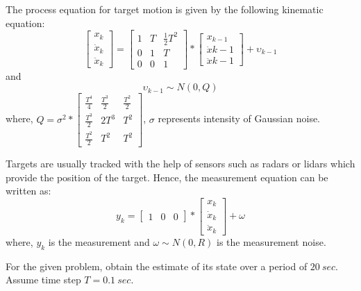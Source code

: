 \documentclass[a4paper,12pt]{extarticle}
\theoremstyle{mytheor}
\begin{document}
The process equation for target motion is given by the following kinematic equation:
\begin{equation}
\left[ \begin{array}{c} x_k \\ \dot{x}_k \\ \ddot{x}_k \end{array} \right] = 
\left[ \begin{array}{ccc} 1 & T & \frac1{2}T^2 \\ 0 & 1 & T \\ 0 & 0 & 1  \end{array} \right] * \left[ \begin{array}{c} x_{k-1} \\ \dot{x}{k-1} \\ \ddot{x}{k-1} \end{array} \right] + \upsilon_{k-1}
\end{equation}
and 
\begin{equation}
\upsilon_{k-1} \sim N(0, Q)
\end{equation}
where,
$ Q = \sigma^2 * \left[ \begin{array}{ccc} \frac{T^4}{4} & \frac{T^3}{2} & \frac{T^2}{2} \\ \frac{T^3}{2} & 2T^3 & T^2 \\ \frac{T^2}{2} & T^2 & T^2  \end{array} \right] $, $\sigma$ represents intensity of Gaussian noise.

Targets are usually tracked with the help of sensors such as radars or lidars which provide the position of the target. Hence, the measurement equation can be written as:
\begin{equation}
y_k = 
\left[ \begin{array}{ccc} 1 & 0 & 0 \end{array} \right] * \left[ \begin{array}{c} x_k \\ \dot{x}_k \\ \ddot{x}_k \end{array} \right] + \omega
\end{equation}
where, $y_k$ is the measurement and $\omega \sim N(0, R) $ is the measurement noise. 

\hfill

For the given problem, obtain the estimate of its state over a period of $ 20 ~sec $. Assume time step $ T = 0.1 ~sec $. 
\end{document}
